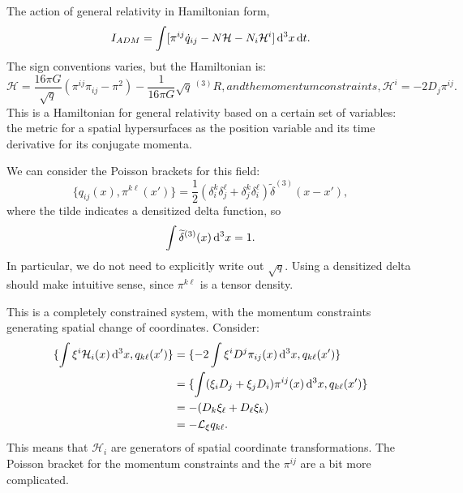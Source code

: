 \lecture

The action of general relativity in Hamiltonian form,
\begin{equation}
I_{ADM} = \int[\pi^{ij}\dot{q}_{ij} - N\mathcal{H}-N_{i}\mathcal{H}^{i}]\,\mathrm{d}^{3}x\,\mathrm{d} t.
\end{equation}
The sign conventions varies, but the Hamiltonian is:
\begin{subequations}
\begin{equation}
\mathcal{H} = \frac{16\pi G}{\sqrt{q}}(\pi^{ij}\pi_{ij}-\pi^{2}) -
\frac{1}{16\pi G}\sqrt{q}\,{{}^{(3)}\!R},
\end{equation}
and the momentum constraints,
\begin{equation}
\mathcal{H}^{i} = -2D_{j}\pi^{ij}.
\end{equation}
\end{subequations}
This is a Hamiltonian for general relativity based on a certain set of
variables: the metric for a spatial hypersurfaces as the position
variable and its time derivative for its conjugate momenta.

We can consider the Poisson brackets for this field:
\begin{equation}
\{q_{ij}(x),\pi^{k\ell}(x')\} =
\frac{1}{2}(\delta^{k}_{i}\delta^{\ell}_{j}
+\delta^{k}_{j}\delta^{\ell}_{i})\widetilde{\delta}^{(3)}(x-x'),
\end{equation}
where the tilde indicates a densitized delta function, so
\begin{equation}
\int\widetilde{\delta}^{(3)}(x)\,\mathrm{d}^{3}x=1.
\end{equation}
In particular, we do not need to explicitly write out $\sqrt{q}$. Using
a densitized delta should make intuitive sense, since $\pi^{k\ell}$ is a
tensor density.

This is a completely constrained system, with the momentum constraints
generating spatial change of coordinates. Consider:
\begin{subequations}
  \begin{align}
    \{\int\xi^{i}\mathcal{H}_{i}(x)\,\mathrm{d}^{3}x, q_{k\ell}(x')\}
    &=\{-2\int\xi^{i}D^{j}\pi_{ij}(x)\,\mathrm{d}^{3}x, q_{k\ell}(x')\}\\
    &=\{\int(\xi_{i}D_{j} + \xi_{j}D_{i})\pi^{ij}(x)\,\mathrm{d}^{3}x, q_{k\ell}(x')\}\\
    &= - (D_{k}\xi_{\ell}+D_{\ell}\xi_{k})\\
    &= -\mathcal{L}_{\xi}q_{k\ell}.
  \end{align}
\end{subequations}
This means that $\mathcal{H}_{i}$ are generators of spatial coordinate
transformations. The Poisson bracket for the momentum constraints and
the $\pi^{ij}$ are a bit more complicated.

